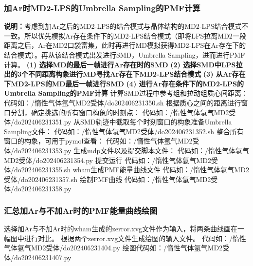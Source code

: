 \subsubsection{加Ar时MD2-LPS的Umbrella Sampling的PMF计算}
\noindent\textbf{说明：}考虑到加Ar之后的MD2-LPS的结合模式与晶体结构的MD2-LPS结合模式不一致。所以优先模拟Ar存在条件下的MD2-LPS结合模式（即将LPS拉离MD2一段距离之后，Ar在MD2口袋富集，此时再进行MD模拟获得MD2-LPS在Ar存在下的结合模式）。再从该结合模式出发进行SMD，Umbrella Sampling，进而进行PMF计算。
\newline\textbf{(1) 选择MD的最后一帧进行Ar存在时的SMD}
\newline\textbf{(2) 选择SMD中LPS拉出的3个不同距离构象进行MD寻找Ar存在下MD2-LPS结合模式}
\newline\textbf{(3) 从Ar存在下MD2-LPS的MD最后一帧进行SMD}
\newline\textbf{(4) 进行Ar存在条件下的MD2-LPS的Umbrella Sampling的PMF计算}
\newline 计算SMD过程中参考组和拉动组质心间距离：
\newline 代码如：/惰性气体氩气MD2受体/do202406231350.sh
\newline 根据质心之间的距离进行窗口分割，确定挑选的所有窗口构象的时刻点：
\newline 代码如：/惰性气体氩气MD2受体/do202406231351.py
\newline 从SMD轨迹中截取每个时刻窗口的构象准备Umbrella Sampling文件：
\newline 代码如：/惰性气体氩气MD2受体/do202406231352.sh
\newline 整合所有窗口的构象，可用于pymol查看：
\newline 代码如：/惰性气体氩气MD2受体/do202406231353.py
\newline 生成mdp文件以及提交脚本文件：
\newline 代码如：/惰性气体氩气MD2受体/do202406231354.py
\newline 提交运行
\newline 代码如：/惰性气体氩气MD2受体/do202406231355.sh
\newline wham生成PMF能量曲线文件
\newline 代码如：/惰性气体氩气MD2受体/do202406231357.sh
\newline 绘制PMF曲线
\newline 代码如：/惰性气体氩气MD2受体/do202406231358.py
\subsubsection{汇总加Ar与不加Ar时的PMF能量曲线绘图}
\noindent 选择加Ar与不加Ar时的wham生成的zerror.xvg文件作为输入，将两条曲线画在一幅图中进行对比。
\newline 根据两个zerror.xvg文件生成绘图的输入文件。
\newline 代码如：/惰性气体氩气MD2受体/do202406231404.py
\newline 绘图代码如：/惰性气体氩气MD2受体/do202406231407.py

